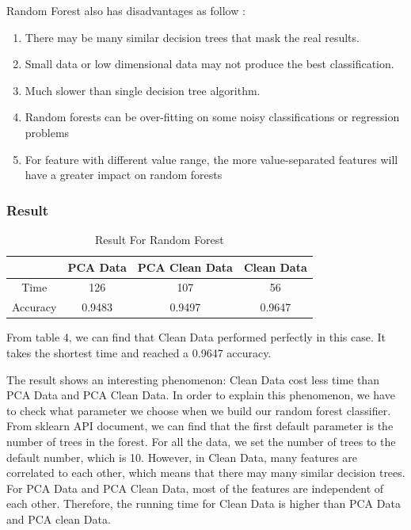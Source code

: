 \documentclass[sigconf]{acmart}
\begin{document}
Random Forest also has disadvantages as follow \cite{RF}:
\begin{enumerate}
    \item There may be many similar decision trees that mask the real results.
    \item Small data or low dimensional data may not produce the best classification.
    \item Much slower than single decision tree algorithm.
    \item Random forests can be over-fitting on some noisy classifications or regression problems
    \item For feature with different value range, the more value-separated features will have a greater impact on random forests
\end{enumerate}

\subsubsection{Result}

\begin{table}[htb]
    \centering
    \begin{tabular}{|c|c|c|c|} \hline
                 &  PCA Data & PCA Clean Data & Clean Data \\ \hline
        Time     &  126      & 107             & 56        \\
        Accuracy &  0.9483   & 0.9497          & 0.9647    \\ \hline
    \end{tabular}
    \caption{Result For Random Forest}
\end{table}

From table 4, we can find that Clean Data performed perfectly in this case. It takes the shortest time and reached a 0.9647 accuracy.

The result shows an interesting phenomenon: Clean Data cost less time than PCA Data and PCA Clean Data. In order to explain this phenomenon, we have to check what parameter we choose when we build our random forest classifier. From sklearn API document, we can find that the first default parameter is the number of trees in the forest. For all the data, we set the number of trees to the default number, which is 10. However, in Clean Data, many features are correlated to each other, which means that there may many similar decision trees. For PCA Data and PCA Clean Data, most of the features are independent of each other. Therefore, the running time for Clean Data is higher than PCA Data and PCA clean Data. 
\end{document}
